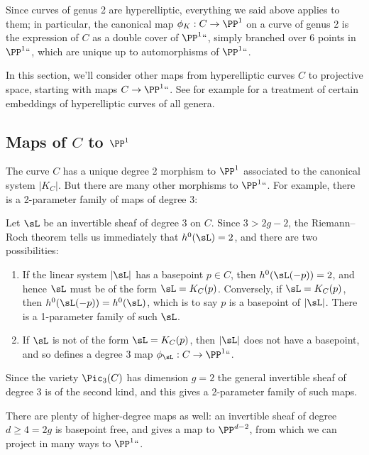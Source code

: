 Since  curves of genus 2 are hyperelliptic, everything we said above
applies to them; in particular, the canonical map $\phi_K : C \to \PP^1$
on a
curve of genus 2
%
 is the expression of $C$ as a double cover of
$\PP^1` `$, simply branched over 6 points in~$\PP^1` `$, which are unique up
to automorphisms of $\PP^1` `$.

In this section, we'll consider other maps from hyperelliptic curves $C$
to projective space, starting with maps $C \to \PP^1` `$.
See for example \cite{transcanonical} for a treatment of certain
embeddings of hyperelliptic curves of all genera.

\subsection*{Maps of $C$ to $\PP^1$}

The curve $C$ has a unique degree 2 morphism to $\PP^1$  associated
to the canonical system $|K_C|$. But there are many other morphisms to
$\PP^1` `$. For example, there is a 2-parameter
family of maps of degree 3:

 Let $\sL$ be an invertible sheaf of degree 3 on $C$. Since $3 > 2g-2$,
 the
Riemann--Roch theorem
%
 tells us immediately that $h^0(\sL) = 2$, and
 there are two possibilities:

\begin{enumerate}
\item If the linear system $|\sL|$ has a basepoint $p \in C$,
then $h^0(\sL(-p)) = 2$, and hence $\sL$ must be of the form $\sL =
K_C(p)$. Conversely, if $\sL = K_C(p)$, then $h^0(\sL(-p)) = h^0(\sL)$, which
is to say $p$ is a basepoint of $|\sL|$. There is a 1-parameter family of
such $\sL$.

\item If $\sL$ is not of the form $\sL = K_C(p)$, then $|\sL|$ does not have
\label{genus 2 pencil} %
a basepoint, and so defines a degree 3 map $\phi_\sL : C \to \PP^1` `$.
\end{enumerate}

Since the variety $\Pic_3(C)$ has dimension $g= 2$ the general invertible
sheaf of degree 3 is of the second kind, and this gives a 2-parameter
family of such maps.

There are plenty of higher-degree maps as well: an invertible sheaf of
degree $d \geq 4 = 2g$ is basepoint free, and gives a map to $\PP^{d-2}$,
from which we can project in many ways
to $\PP^1` `$.

